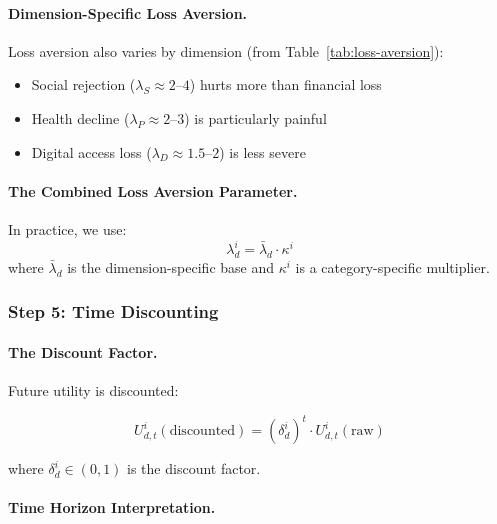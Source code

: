 \paragraph{Dimension-Specific Loss Aversion.}
Loss aversion also varies by dimension (from Table~\ref{tab:loss-aversion}):

\begin{itemize}
\item Social rejection ($\lambda_S \approx 2$--$4$) hurts more than financial loss
\item Health decline ($\lambda_P \approx 2$--$3$) is particularly painful
\item Digital access loss ($\lambda_D \approx 1.5$--$2$) is less severe
\end{itemize}

\paragraph{The Combined Loss Aversion Parameter.}
In practice, we use:
\begin{equation}
\lambda^i_d = \bar{\lambda}_d \cdot \kappa^i
\end{equation}
where $\bar{\lambda}_d$ is the dimension-specific base and $\kappa^i$ is 
a category-specific multiplier.

\subsubsection{Step 5: Time Discounting}

\paragraph{The Discount Factor.}
Future utility is discounted:

\begin{equation}
U^i_{d,t}(\text{discounted}) = (\delta^i_d)^t \cdot U^i_{d,t}(\text{raw})
\label{eq:discounted-utility}
\end{equation}

where $\delta^i_d \in (0, 1)$ is the discount factor.

\paragraph{Time Horizon Interpretation.}

